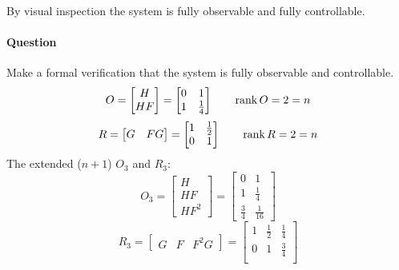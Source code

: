 \begin{exercise}
\begin{figure}[H]
    \end{figure}


    By visual inspection the system is fully observable and fully controllable.

    \paragraph{Question} Make a formal verification that the system is fully observable and controllable.
    \[
        O = \begin{bmatrix}
            H \\ HF
        \end{bmatrix} = \begin{bmatrix}
            0 & 1 \\
            1 & \frac{1}{4}
        \end{bmatrix}
        \qquad
        \operatorname*{rank} O = 2 = n
    \]
    \[
        R = \begin{bmatrix}
            G & FG
        \end{bmatrix} = \begin{bmatrix}
            1 & \frac{1}{2} \\
            0 & 1
        \end{bmatrix}
        \qquad
        \operatorname*{rank} R = 2 = n
    \]
    The extended ($n+1$) $O_3$ and $R_3$:
    \[
        O_3 = \begin{bmatrix}
            H \\ HF \\ HF^2
        \end{bmatrix} = \begin{bmatrix}
            0 & 1 \\
            1 & \frac{1}{4} \\
            \frac{3}{4} & \frac{1}{16}
        \end{bmatrix}
    \]
    \[
        R_3 = \begin{bmatrix}
            G & F & F^2G
        \end{bmatrix} = \begin{bmatrix}
            1 & \frac{1}{2} & \frac{1}{4} \\
            0 & 1 & \frac{3}{4} \\
        \end{bmatrix}
    \]


\end{exercise}
